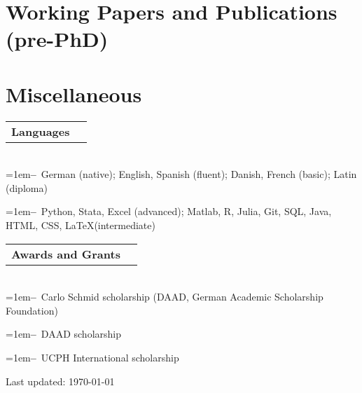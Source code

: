 \documentclass[a4paper,11pt]{article}
\makeatletter
\newcommand{\Subheading}[4]{   
    \vspace{7pt}
    \begin{tabular*}{\textwidth}[t]{@{}l@{\extracolsep{\fill}}r@{}}
        \textbf{#1}\textit{\small #2} & {\footnotesize #3} \\
    \end{tabular*}
    {\small #4}
}
\newcommand{\myitem}[1]{\hangindent=1em\hangafter=1\textbf{--}~#1\par}
\makeatother
\begin{document}
\newpage

\section{Working Papers and Publications (pre-PhD)}
\setlength{\bibitemsep}{1.4ex}
\begin{refsection}
\nocite{*}
\printbibliography[heading=none]
\end{refsection}

\section{Miscellaneous}

\Subheading
    {Languages}{}{}
    {\\
    \myitem{German (native); English, Spanish (fluent); Danish, French (basic); Latin (diploma)}
    \myitem{Python, Stata, Excel (advanced); Matlab, R, Julia, Git, SQL, Java, HTML, CSS, \LaTeX\space(intermediate)}
    }

\Subheading
    {Awards and Grants}{}{}
    {\\
    \myitem{Carlo Schmid scholarship (DAAD, German Academic Scholarship Foundation)}
    \myitem{DAAD scholarship}
    \myitem{UCPH International scholarship}
    } 

\vfill
\begin{center}
{\footnotesize Last updated: \today}
\end{center}
\end{document}
